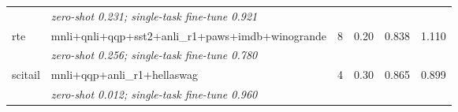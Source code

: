 \begin{table}[t]
\begin{tabular}{llrrrr}
    & \multicolumn{5}{l}{\textit{zero-shot 0.231; single-task fine-tune 0.921}} \\
    \addlinespace
    rte & mnli+qnli+qqp+sst2+anli\_r1+paws+imdb+winogrande & 8 & 0.20 & 0.838 & 1.110 \\
    & \multicolumn{5}{l}{\textit{zero-shot 0.256; single-task fine-tune 0.780}} \\
    \addlinespace
    scitail & mnli+qqp+anli\_r1+hellaswag & 4 & 0.30 & 0.865 & 0.899 \\
    & \multicolumn{5}{l}{\textit{zero-shot 0.012; single-task fine-tune 0.960}} \\
    \bottomrule
  \end{tabular}
\end{table}
